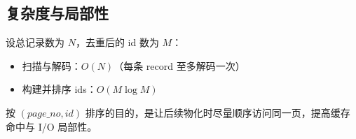 \subsection{复杂度与局部性}

设总记录数为 \(N\)，去重后的 id 数为 \(M\)：

\begin{itemize}
  \item 扫描与解码：\(O(N)\)（每条 record 至多解码一次）
  \item 构建并排序 ids：\(O(M \log M)\)
\end{itemize}

按 \((page\_no, id)\) 排序的目的，是让后续物化时尽量顺序访问同一页，提高缓存命中与 I/O 局部性。

